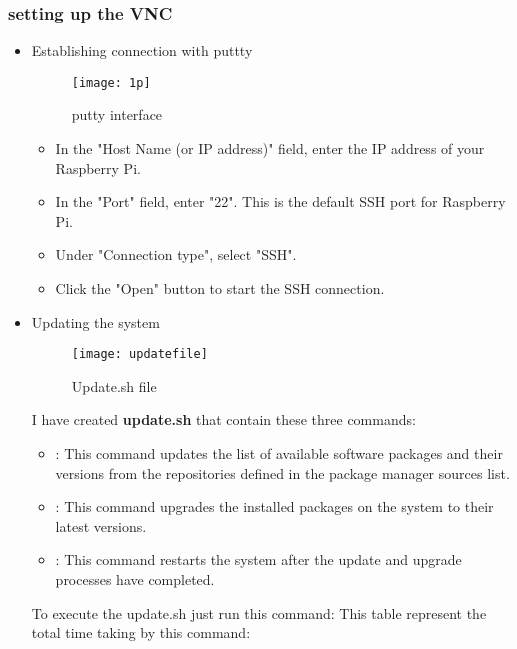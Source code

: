 \subsubsection{setting up the VNC}
\begin{itemize}
\item{Establishing connection with puttty}
\FloatBarrier
\begin{figure}[h]

       \centering

        \texttt{[image: 1p]}
   
        \caption{putty interface}
        \label{fig:putty interface}

    \end{figure}

\FloatBarrier
\begin{itemize}
\item In the "Host Name (or IP address)" field, enter the IP address of your Raspberry Pi.
\item In the "Port" field, enter "22". This is the default SSH port for Raspberry Pi.
\item Under "Connection type", select "SSH".
\item Click the "Open" button to start the SSH connection.
\end{itemize}
\item{Updating the system}
\FloatBarrier
\begin{figure}[h]

       \centering

        \texttt{[image: updatefile]}
   
        \caption{Update.sh file}
        \label{fig:update.sh}

    \end{figure}

\FloatBarrier
I have created \textbf{update.sh} that contain these three commands:
\begin{itemize}
\item{} : This command updates the list of available software packages and their versions from the repositories defined in the package manager sources list.
\item {}: This command upgrades the installed packages on the system to their latest versions.
\item  {}: This command restarts the system after the update and upgrade processes have completed.
\end{itemize}
To execute the update.sh just run this command:
This table represent the total time taking by this command:\\
\FloatBarrier
\begin{table}[h]


\end{table}
\end{itemize}
